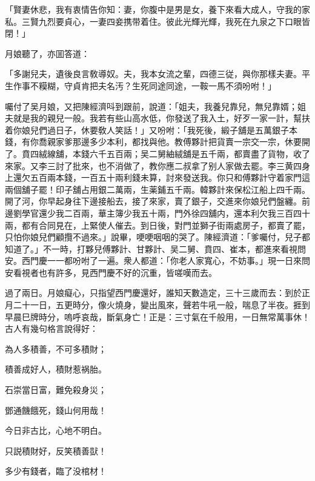\begin{myquote}
「賢妻休悲，我有衷情告你知：妻，你腹中是男是女，養下來看大成人，守我的家私。三賢九烈要貞心，一妻四妾携带着住。彼此光輝光輝，我死在九泉之下口眼皆閉！」
\end{myquote}

月娘聽了，亦囬答道：

\begin{myquote}
「多謝兒夫，遺後良言敎導奴。夫，我本女流之輩，四德三従，與你那樣夫妻。平生作事不糢糊，守貞肯把夫名汚？生死同途同途，一鞍一馬不須吩咐！」
\end{myquote}

囑付了吴月娘，又把陳經濟呌到跟前，說道：「姐夫，我養兒靠兒，無兒靠婿；姐夫就是我的親兒一般。我若有些山高水低，你發送了我入土，好歹一家一計，幫扶着你娘兒們過日子，休要敎人笑話！」又吩咐：「我死後，緞子舖是五萬銀子本錢，有你喬親家爹那邊多少本利，都找與他。教傅夥計把貨賣一宗交一宗，休要開了。賁四絨線舖，本錢六千五百兩；吴二舅紬絨舖是五千兩，都賣盡了貨物，收了來家。又李三討了批來，也不消做了，教你應二叔拿了别人家做去罷。李三黄四身上還欠五百兩本錢，一百五十兩利錢未算，討來發送我。你只和傅夥計守着家門這兩個舖子罷！印子舖占用銀二萬兩，生薬鋪五千兩。韓夥計來保松江船上四千兩。開了河，你早起身往下邊接船去，接了來家，賣了銀子，交進來你娘兒們盤纏。前邊劉學官還少我二百兩，華主簿少我五十兩，門外徐四舖内，還本利欠我三百四十兩，都有合同見在，上緊使人催去。到日後，對門並獅子街兩處房子，都賣了罷，只怕你娘兒們顧攬不過來。」說畢，哽哽咽咽的哭了。陳經濟道：「爹囑付，兒子都知道了。」不一時，打夥兒傅夥計、甘夥計、吴二舅、賁四、崔本，都進來看視問安。西門慶一一都吩咐了一遍。衆人都道：「你老人家寬心，不妨事。」現一日來問安看視者也有許多，見西門慶不好的沉重，皆嗟嘆而去。

過了兩日。月娘癡心，只指望西門慶還好，誰知天數造定，三十三歲而去：到於正月二十一日，五更時分，像火燒身，變出風來，聲若牛吼一般，喘息了半夜。捱到早晨巳牌時分，嗚呼哀哉，斷氣身亡！正是：三寸氣在千般用，一日無常萬事休！古人有幾句格言說得好：

\begin{myquote}
為人多積善，不可多積財；

積善成好人，積財惹祸胎。

石崇當日富，難免殺身災；

鄧通饑餓死，錢山何用哉！

今日非古比，心地不明白。

只説積財好，反笑積善獃！

多少有錢者，臨了没棺材！
\end{myquote}

